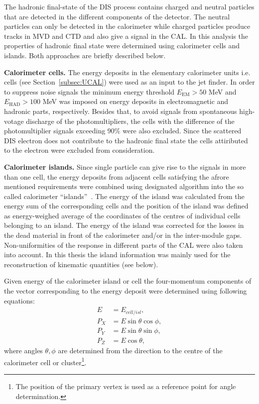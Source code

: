 The hadronic final-state of the DIS process contains charged and neutral particles that are detected in the different components of the \zeus detector. The neutral particles can only be detected in the calorimeter while charged particles produce tracks in MVD and CTD and also give a signal in the CAL. In this analysis the properties of hadronic final state were determined using calorimeter cells and islands. Both approaches are briefly described below.

\textbf{Calorimeter cells.}
The energy deposits in the elementary calorimeter units i.e. cells (see Section~\ref{subsec:UCAL}) were used as an input to the jet finder. In order to suppress noise signals the minimum energy threshold $E_\text{EM}>50$ MeV and $E_\text{HAD}>100$ MeV was imposed on energy deposits in electromagnetic and hadronic parts, respectively. Besides that, to avoid signals from spontaneous high-votage discharge of the photomultipliers, the cells with the difference of the photomultiplier signals exceeding 90\% were also excluded. Since the scattered DIS electron does not contribute to the hadronic final state the cells attiributed to the electron were excluded from consideration. 

\textbf{Calorimeter islands.}
Since single particle can give rise to the signals in more than one cell, the energy deposits from adjacent cells satisfying the afrore mentioned requirements were combined using designated algorithm into the so called calorimeter ``islands''~\cite{upub:grosse-knetter:zn9739}. The energy of the island was calculated from the energy sum of the corresponding cells and the position of the island was defined as energy-weighed average of the coordinates of the centres of individual cells belonging to an island. The energy of the island was corrected for the losses in the dead material in front of the calorimeter and/or in the inter-module gaps. Non-uniformities of the response in different parts of the CAL were also taken into account. In this thesis the island information was mainly used for the reconstruction of kinematic quantities (see below).

Given energy of the calorimeter island or cell the four-momentum components of the vector corresponding to the energy deposit were determined using following equations:
\begin{align}
	E    &= E_{cell/isl}, \\
	P_X &= E \sin{\theta}\cos{\phi}, \\
	P_Y &= E \sin{\theta}\sin{\phi}, \\
	P_Z &= E \cos{\theta},
\end{align}
where angles $\theta, \phi$ are determined from the direction to the centre of the calorimeter cell or cluster\footnote{The position of the primary vertex is used as a reference point for angle determination.}.